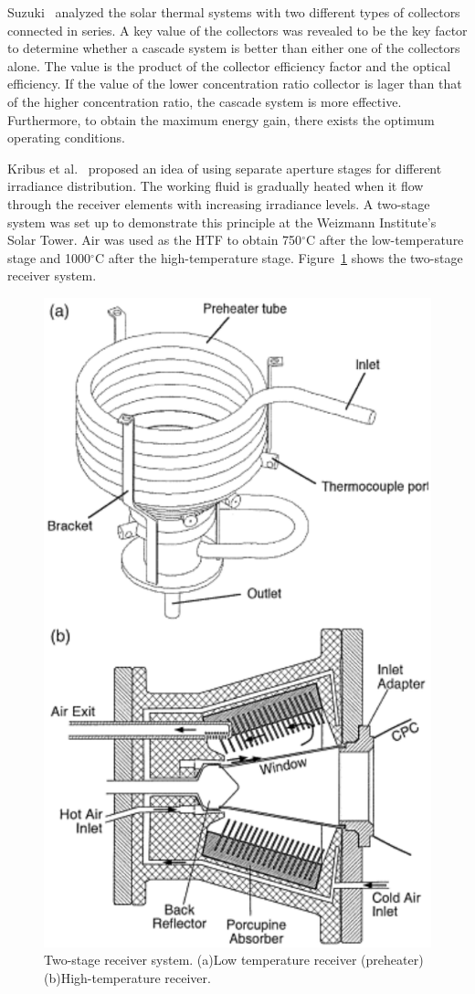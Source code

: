 Suzuki~\cite{Suzuki1986} analyzed the solar thermal systems with two different types of collectors connected in series. A key value of the collectors was revealed to be the key factor to determine whether a cascade system is better than either one of the collectors alone. The value is the product of the collector efficiency factor and the optical efficiency. If the value of the lower concentration ratio collector is lager than that of the higher concentration ratio, the cascade system is more effective. Furthermore, to obtain the maximum energy gain, there exists the optimum operating conditions.

Kribus et al.~\cite{Kribus1999} proposed an idea of using separate aperture stages for different irradiance distribution. The working fluid is gradually heated when it flow through the receiver elements with increasing irradiance levels. A two-stage system was set up to demonstrate this principle at the Weizmann Institute's Solar Tower. Air was used as the HTF to obtain 750$\mathrm{^\circ C}$ after the low-temperature stage and 1000$\mathrm{^\circ C}$ after the high-temperature stage. Figure~\ref{fig:Kribus1999} shows the two-stage receiver system.

\begin{figure}[!ht]
\centering
\includegraphics[width=.6\textwidth]{fig/Kribus1999.pdf}
\caption{Two-stage receiver system. (a)Low temperature receiver (preheater) (b)High-temperature receiver.}\label{fig:Kribus1999}
\end{figure}


